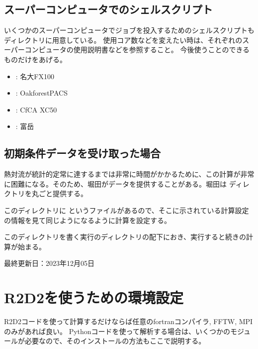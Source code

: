 \documentclass[letterpaper,10pt,dvipdfmx,report]{sphinxmanual}
\begin{document}
\section{スーパーコンピュータでのシェルスクリプト}
\label{\detokenize{start:id5}}
\sphinxAtStartPar
いくつかのスーパーコンピュータでジョブを投入するためのシェルスクリプトも  ディレクトリに用意している。
使用コア数などを変えたい時は、それぞれのスーパーコンピュータの使用説明書などを参照すること。
今後使うことのできるものだけをあげる。
\begin{itemize}
\item {} 
\sphinxAtStartPar
{} : 名大FX100

\item {} 
\sphinxAtStartPar
{} : Oakforest\sphinxhyphen{}PACS

\item {} 
\sphinxAtStartPar
{} : CfCA XC50

\item {} 
\sphinxAtStartPar
{} : 富岳

\end{itemize}


\section{初期条件データを受け取った場合}
\label{\detokenize{start:id6}}
\sphinxAtStartPar
熱対流が統計的定常に達するまでは非常に時間がかかるために、この計算が非常に困難になる。そのため、堀田がデータを提供することがある。堀田は  ディレクトリを丸ごと提供する。

\sphinxAtStartPar
このディレクトリに  というファイルがあるので、そこに示されている計算設定の情報を見て同じようになるように計算を設定する。

\sphinxAtStartPar
このディレクトリを書く実行のディレクトリの配下におき、実行すると続きの計算が始まる。

\sphinxAtStartPar
最終更新日：2023年12月05日

\sphinxstepscope


\chapter{R2D2を使うための環境設定}
\label{\detokenize{environment:r2d2}}\label{\detokenize{environment::doc}}
\sphinxAtStartPar
R2D2コードを使って計算するだけならば任意のfortranコンパイラ, FFTW, MPIのみがあれば良い。
Pythonコードを使って解析する場合は、いくつかのモジュールが必要なので、そのインストールの方法もここで説明する。
\end{document}
